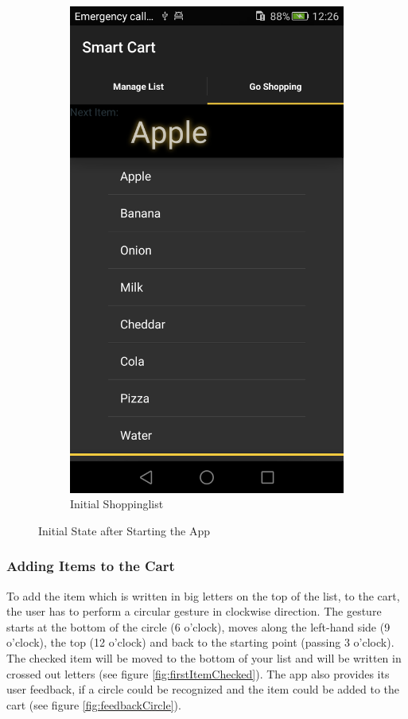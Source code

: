 \begin{figure}[h]
\begin{subfigure}{0.475\textwidth}
\includegraphics[height= 0.3\textheight]{res/usermanual/initialShoppinglist.png}
\caption{Initial Shoppinglist}
\label{fig:initial}
\end{subfigure}
\caption{Initial State after Starting the App}
\label{fig:initialState}
\end{figure}

\subsubsection{Adding Items to the Cart}
To add the item which is written in big letters on the top of the list, to the
cart, the user has to perform a circular gesture in clockwise direction.
The gesture starts at the bottom of the circle (6 o'clock), moves along the
left-hand side (9 o'clock), the top (12 o'clock) and back to the starting point
(passing 3 o'clock). The checked item will be moved to the bottom of your list
and will be written in crossed out letters (see figure
\ref{fig:firstItemChecked}). The app also provides its user feedback, if a
circle could be recognized and the item could be added to the cart (see figure
\ref{fig:feedbackCircle}).

